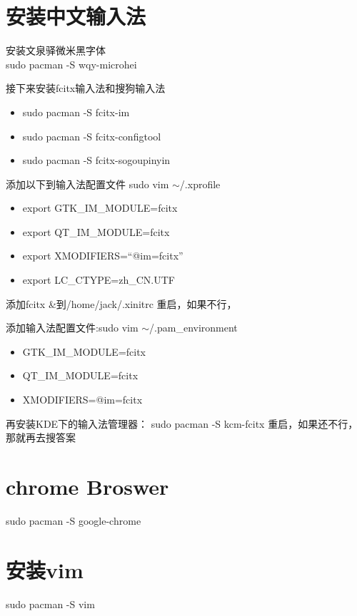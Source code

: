 \documentclass[utf8]{book}
\begin{document}
\begin{appendices}
	\section{安装中文输入法}\label{m2}
	
	安装文泉驿微米黑字体\\
	\indent sudo pacman -S wqy-microhei
	
	接下来安装fcitx输入法和搜狗输入法
	\begin{itemize}
		\item sudo pacman -S fcitx-im
		\item sudo pacman -S fcitx-configtool
		\item sudo pacman -S fcitx-sogoupinyin
	\end{itemize}

	添加以下到输入法配置文件 sudo vim \quad $\sim$/.xprofile\\
	\begin{itemize}
		\item 	export GTK\_IM\_MODULE=fcitx
		\item export QT\_IM\_MODULE=fcitx
		\item export XMODIFIERS=“@im=fcitx”
		\item export LC\_CTYPE=zh\_CN.UTF
	\end{itemize}

	添加fcitx \&到/home/jack/.xinitrc
	重启，如果不行，

	添加输入法配置文件:sudo vim \quad $\sim$/.pam\_environment
	\begin{itemize}
		\item GTK\_IM\_MODULE=fcitx
		\item QT\_IM\_MODULE=fcitx
		\item XMODIFIERS=@im=fcitx
	\end{itemize}

	再安装KDE下的输入法管理器：
	sudo pacman -S kcm-fcitx
	重启，如果还不行，那就再去搜答案
	
	\section{chrome Broswer}\label{m3}
	
	sudo pacman -S google-chrome
	
	\section{安装vim}\label{m4}
	
	sudo pacman -S  vim
	

\end{appendices}
\end{document}

